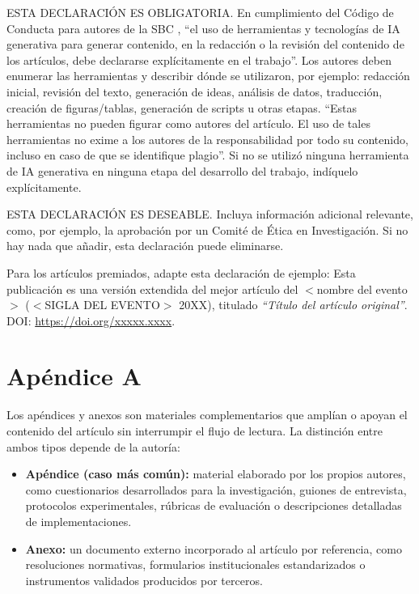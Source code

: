 \documentclass[spanish]{rbie2026}%
\begin{document}
\begin{declarations}
\begin{aiusagedeclaration}
ESTA DECLARACIÓN ES OBLIGATORIA. En cumplimiento del Código de Conducta para autores de la SBC \citeyearpar{SBC2024conduta_pt}, ``el uso de herramientas y tecnologías de IA generativa para generar contenido, en la redacción o la revisión del contenido de los artículos, debe declararse explícitamente en el trabajo''. Los autores deben enumerar las herramientas y describir dónde se utilizaron, por ejemplo: redacción inicial, revisión del texto, generación de ideas, análisis de datos, traducción, creación de figuras/tablas, generación de scripts u otras etapas. ``Estas herramientas no pueden figurar como autores del artículo. El uso de tales herramientas no exime a los autores de la responsabilidad por todo su contenido, incluso en caso de que se identifique plagio''. Si no se utilizó ninguna herramienta de IA generativa en ninguna etapa del desarrollo del trabajo, indíquelo explícitamente.
\end{aiusagedeclaration}


\begin{furtherinformation}
ESTA DECLARACIÓN ES DESEABLE. Incluya información adicional relevante, como, por ejemplo, la aprobación por un Comité de Ética en Investigación. Si no hay nada que añadir, esta declaración puede eliminarse.

Para los artículos premiados, adapte esta declaración de ejemplo: Esta publicación es una versión extendida del mejor artículo del $<$nombre del evento$>$ ($<$SIGLA DEL EVENTO$>$ 20XX), titulado \textit{``Título del artículo original''}. DOI: \url{https://doi.org/xxxxx.xxxx}.

\end{furtherinformation}
\end{declarations}







\section*{Apéndice A}

Los apéndices y anexos son materiales complementarios que amplían o apoyan el contenido del artículo sin interrumpir el flujo de lectura. La distinción entre ambos tipos depende de la autoría:

\begin{itemize}
  \item \textbf{Apéndice (caso más común):} material elaborado por los propios autores, como cuestionarios desarrollados para la investigación, guiones de entrevista, protocolos experimentales, rúbricas de evaluación o descripciones detalladas de implementaciones.

  \item \textbf{Anexo:} un documento externo incorporado al artículo por referencia, como resoluciones normativas, formularios institucionales estandarizados o instrumentos validados producidos por terceros.
\end{itemize}
\end{document}
